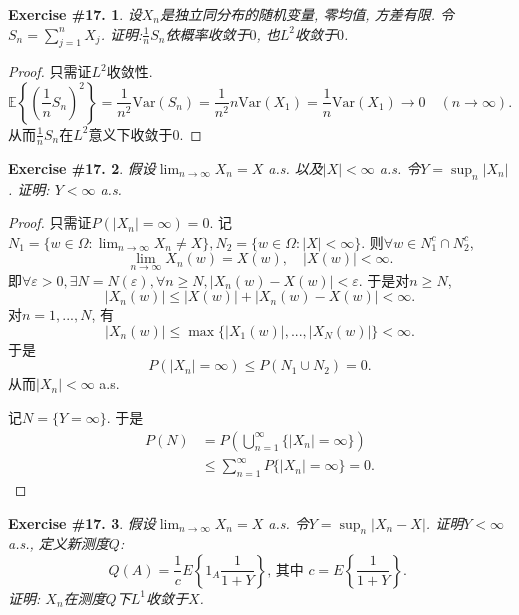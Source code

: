 \documentclass[UTF8, a4paper]{article}
\newtheorem{exercise}{Exercise \#17.}
\begin{document}
\begin{framed}
\begin{exercise}
设\(X_n\)是独立同分布的随机变量, 零均值, 方差有限.
令\(S_n = \sum_{j=1}^{n}X_j\).
证明:\(\frac{1}{n}S_n\)依概率收敛于\(0\), 也\(L^2\)收敛于\(0\).
\end{exercise}
\end{framed}

\begin{proof}
只需证\(L^2\)收敛性.
$$
\mathbb{E}\left\{\left(\frac{1}{n}S_n\right)^2\right\} = \frac{1}{n^2}\text{Var}(S_n) = \frac{1}{n^2}n\text{Var}(X_1) = \frac{1}{n}\text{Var}(X_1) \to 0 \quad (n\to \infty).
$$
从而\(\frac{1}{n}S_n\)在\(L^2\)意义下收敛于\(0\).
\end{proof}


\begin{framed}
\begin{exercise}
假设\(\lim_{n\to\infty} X_n = X\) a.s. 以及\(|X| < \infty\) a.s. 令\(Y = \sup_n |X_n|\).
证明: \(Y < \infty\) a.s.
\end{exercise}
\end{framed}

\begin{proof}
只需证\(P(|X_n| = \infty) = 0\).
记\(N_1 = \{w\in \Omega: \lim_{n\to\infty} X_n \neq X\}, N_2 = \{w\in\Omega: |X| < \infty\}\).
则\(\forall w\in N_1^c \cap N_2^c\), 
$$
\lim_{n\to\infty} X_n(w) = X(w), \quad |X(w)| < \infty.
$$
即\(\forall \varepsilon > 0, \exists N = N(\varepsilon), \forall n \geq N, |X_n(w) - X(w)| < \varepsilon\).
于是对\(n \geq N\), 
$$
|X_n(w)| \leq |X(w)| + |X_n(w) - X(w)| < \infty.
$$
对\(n = 1,...,N\), 有
$$
|X_n(w)| \leq \max\{|X_1(w)|, ..., |X_N(w)|\} < \infty.
$$
于是 
$$
P(|X_n| = \infty) \leq P(N_1 \cup N_2) = 0.
$$
从而\(|X_n| < \infty\) a.s.


记\(N = \{Y = \infty\}\). 于是
$$
\begin{aligned}
    P(N) &= P\left(\bigcup_{n=1}^{\infty}\{|X_n| = \infty\}\right) \\
    &\leq \sum_{n=1}^{\infty}P\{|X_n| = \infty\} = 0.
\end{aligned}
$$
\end{proof}



\begin{framed}
\begin{exercise}
假设\(\lim_{n\to\infty} X_n = X\) a.s. 令\(Y = \sup_n|X_n - X|\).
证明\(Y < \infty\) a.s., 定义新测度\(Q\):
$$
Q(A)=\frac{1}{c} E\left\{1_A \frac{1}{1+Y}\right\} \text {, 其中 } c=E\left\{\frac{1}{1+Y}\right\} \text {. }
$$
证明: \(X_n\)在测度\(Q\)下\(L^1\)收敛于\(X\).
\end{exercise}
\end{framed}
\end{document}
